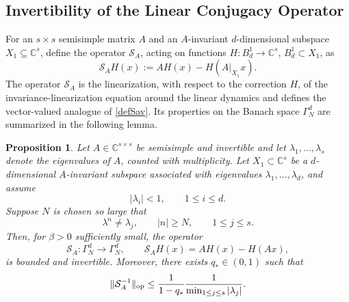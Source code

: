 \documentclass{amsart}
\theoremstyle{plain}
\newtheorem{proposition}[theorem]{Proposition}
\theoremstyle{definition}
\begin{document}
\subsection{Invertibility of the Linear Conjugacy Operator}

For an $s\times s$ semisimple matrix $A$ and an $A$-invariant $d$-dimensional subspace $X_1\subseteq \mathbb{C}^s$, define the operator $\mathcal{S}_A$, acting on functions $H:B^1_{d}\to\mathbb{C}^s$, $B^1_{d}\subset X_1$, as
	\begin{equation}\label{defS}
	\mathcal{S}_AH(x):=AH(x)-H(A|_{X_1}x).
	\end{equation}
The operator $\mathcal{S}_A$ is the linearization, with respect to the correction $H$, of the invariance-linearization equation around the linear dynamics and defines the vector-valued analogue of \eqref{defSav}. Its properties on the Banach space $\Gamma_N^d$ are summarized in the following lemma.



\begin{proposition}\label{Lemma_SM}
Let $A\in\mathbb C^{s\times s}$ be semisimple and invertible and let $\lambda_1,\ldots,\lambda_s$ denote the eigenvalues of $A$, counted with
multiplicity. Let
$X_1\subset\mathbb C^s$ be a $d$-dimensional $A$-invariant subspace associated with
eigenvalues $\lambda_1,\ldots,\lambda_d$, and assume
\begin{equation}
        |\lambda_i|<1,
        \qquad
        1\leq i\leq d.
\end{equation}
Suppose $N$ is chosen so large that
\begin{equation}\label{nonres_tail}
        \lambda^n\ne \lambda_j,
        \qquad
        |n|\geq N,
        \qquad
        1\leq j\leq s.
\end{equation}
Then, for $\beta>0$ sufficiently small, the operator
\begin{equation}
        \mathcal S_A:\Gamma_N^d\to\Gamma_N^d,
        \qquad
        \mathcal S_A H(x)=AH(x)-H(Ax),
\end{equation}
is bounded and invertible. Moreover, there exists $q_*\in(0,1)$ such that
\begin{equation}\label{SA_inverse_bound}
        \|\mathcal S_A^{-1}\|_{\rm op}
        \le
        \frac{1}{1-q_*}
        \frac{1}{\min_{1\leq j\leq s}|\lambda_j|}.
\end{equation}
\end{proposition}
\end{document}
